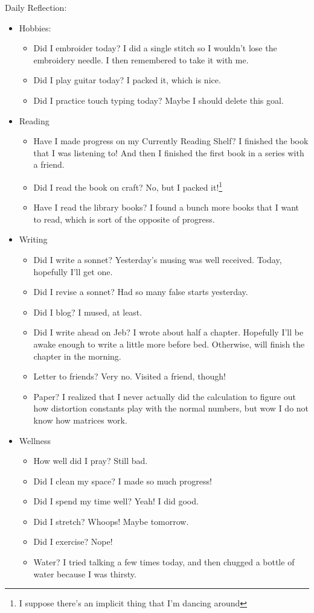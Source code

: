 \documentclass[12pt]{article}[titlepage]
\renewcommand{\,}{\textsuperscript{,}}
\begin{document}
Daily Reflection:
\begin{itemize}
\item Hobbies:
\begin{itemize}
\item Did I embroider today? I did a single stitch so I wouldn't lose the embroidery needle. I then remembered to take it with me.
\item Did I play guitar today? I packed it, which is nice.
\item Did I practice touch typing today? Maybe I should delete this goal.
\end{itemize}
\item Reading
\begin{itemize}
\item Have I made progress on my Currently Reading Shelf? I finished the book that I was listening to! And then I finished the first book in a series with a friend.
\item Did I read the book on craft? No, but I packed it!\footnote{I suppose there's an implicit thing that I'm dancing around}
\item Have I read the library books? I found a bunch more books that I want to read, which is sort of the opposite of progress.
\end{itemize}
\item Writing
\begin{itemize}
\item Did I write a sonnet? Yesterday's musing was well received. Today, hopefully I'll get one.
\item Did I revise a sonnet? Had so many false starts yesterday.
\item Did I blog? I mused, at least.
\item Did I write ahead on Jeb? I wrote about half a chapter. Hopefully I'll be awake enough to write a little more before bed. Otherwise, will finish the chapter in the morning.
\item Letter to friends? Very no. Visited a friend, though!
\item Paper? I realized that I never actually did the calculation to figure out how distortion constants play with the normal numbers, but wow I do not know how matrices work.
\end{itemize}
\item Wellness
\begin{itemize}
\item How well did I pray? Still bad.
\item Did I clean my space? I made so much progress!
\item Did I spend my time well? Yeah! I did good.
\item Did I stretch? Whoops! Maybe tomorrow.
\item Did I exercise? Nope!
\item Water? I tried talking a few times today, and then chugged a bottle of water because I was thirsty.
\end{itemize}
\end{itemize}
\end{document}
